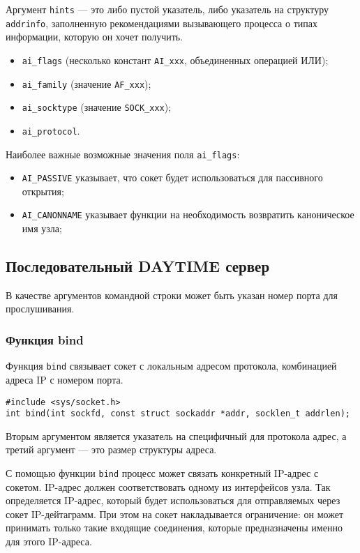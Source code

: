 Аргумент \lstinline{hints} --- это либо пустой указатель, либо указатель на структуру \lstinline{addrinfo}, заполненную рекомендациями вызывающего процесса о типах информации, которую он хочет получить.
\begin{itemize}
  \item \lstinline{ai_flags} (несколько констант \lstinline{AI_xxx}, объединенных операцией ИЛИ);
  \item \lstinline{ai_family} (значение \lstinline{AF_xxx});
  \item \lstinline{ai_socktype} (значение \lstinline{SOCK_xxx});
  \item \lstinline{ai_protocol}.
\end{itemize}

Наиболее важные возможные значения поля \lstinline{ai_flags}:
\begin{itemize}
  \item \lstinline{AI_PASSIVE} указывает, что сокет будет использоваться для пассивного открытия;
  \item \lstinline{AI_CANONNAME} указывает функции на необходимость возвратить каноническое имя узла;
\end{itemize}

\subsection{Последовательный DAYTIME сервер}
В качестве аргументов командной строки может быть указан номер порта для прослушивания.

\lstset{label=lst:date-server,caption=DAYTIME сервер}


\subsubsection{Функция bind}
Функция \lstinline{bind} связывает сокет с локальным адресом протокола, комбинацией адреса IP с номером порта.
\lstset{language=C,caption=}
\begin{lstlisting}
#include <sys/socket.h>
int bind(int sockfd, const struct sockaddr *addr, socklen_t addrlen);
\end{lstlisting}

Вторым аргументом является указатель на специфичный для протокола адрес, а третий аргумент --- это размер структуры адреса.

С помощью функции \lstinline{bind} процесс может связать конкретный IP-адрес с сокетом. IP-адрес должен соответствовать одному из интерфейсов узла. Так определяется IP-адрес, который будет использоваться для отправляемых через сокет IP-дейтаграмм. При этом на сокет накладывается ограничение: он может принимать только такие входящие соединения, которые предназначены именно для этого IP-адреса.

